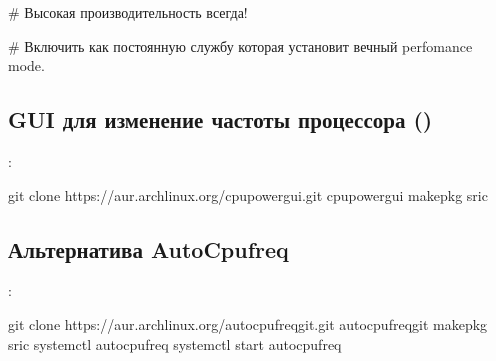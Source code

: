 \documentclass[letterpaper,10pt,russian,openany]{sphinxmanual}
\begin{document}
\noindent{}

\sphinxAtStartPar
{} \# Высокая производительность всегда!

\sphinxAtStartPar
{} \# Включить как постоянную службу которая установит вечный perfomance mode.

\ignorespaces 

\subsection{GUI для изменение частоты процессора ()}
\label{\detokenize{source/extra-optimizations:gui-xanmod}}\label{\detokenize{source/extra-optimizations:cpupower-gui}}\label{\detokenize{source/extra-optimizations:index-1}}
\noindent{}

\sphinxAtStartPar
{}:

\begin{sphinxVerbatim}[commandchars=\\\{\}]
git clone https://aur.archlinux.org/cpupower\PYGZhy{}gui.git
 cpupower\PYGZhy{}gui
makepkg \PYGZhy{}sric
\end{sphinxVerbatim}

\ignorespaces 

\subsection{Альтернатива \sphinxhyphen{} Auto\sphinxhyphen{}Cpufreq}
\label{\detokenize{source/extra-optimizations:auto-cpufreq}}\label{\detokenize{source/extra-optimizations:index-2}}\label{\detokenize{source/extra-optimizations:id3}}
\sphinxAtStartPar
{}:

\begin{sphinxVerbatim}[commandchars=\\\{\}]
git clone https://aur.archlinux.org/auto\PYGZhy{}cpufreq\PYGZhy{}git.git  
 auto\PYGZhy{}cpufreq\PYGZhy{}git                                       
makepkg \PYGZhy{}sric                                             
systemctl  auto\PYGZhy{}cpufreq                             
systemctl start auto\PYGZhy{}cpufreq                              
\end{sphinxVerbatim}
\end{document}
